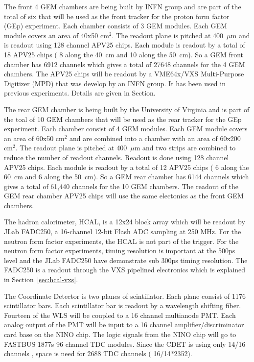 \documentclass{article}
\begin{document}
The front 4 GEM chambers are being built by INFN group and are part of the total of six that
will be used as the front tracker for the proton form factor (GEp) experiment. Each chamber consists
of 3 GEM modules. Each GEM module covers an area of 40x50 cm$^2$. The readout plane is pitched at 400~$\mu$m
and is readout using 128 channel APV25 chips. Each module is readout by a total of 18 APV25 chips ( 8 along
the 40~cm and 10 along the 50~cm). So a GEM front chamber has 6912 channels which gives a total of 27648 channels
for the 4 GEM chambers. The APV25 chips will be readout by a VME64x/VXS Multi-Purpose Digitizer (MPD) that was
develop by an INFN group. It has been used in previous experiments. Details are given in Section.

The rear GEM chamber is being built by the University of Virginia and is part of the toal of 10 GEM chambers
that will be used as the rear tracker for the GEp experiment. Each chamber consist of 4 GEM modules.
 Each GEM module covers an area of 60x50 cm$^2$ and are combined into a chamber with an area
of 60x200 cm$^2$. The readout plane is pitched at 400~$\mu$m and two strips are combined to reduce
the number of readout channels. Readout is done using 128 channel APV25 chips. Each module is readout 
by a total of  12 APV25 chips (  6 along the 60~cm and 6 along the 50~cm). So a GEM rear chamber has  
6144 channels which gives a total of 61,440 channels for the 10 GEM chambers. The readout of the GEM
rear chamber APV25 chips will use the same electonics as the front GEM chambers.  
 
The hadron calorimeter, HCAL, is a 12x24 block array which will be readout by JLab FADC250, a 16-channel 12-bit Flash 
ADC sampling at 250 MHz. For the neutron form factor experiments, the HCAL is not part of the trigger. For the
neutron form factor experiments, timing resolution is important at the 500ps level and the JLab FADC250 have 
demonstrate sub 300ps timing resolution. The FADC250 is a readout through the VXS pipelined electronics
which is explained in Section~\ref{sec:hcal-vxs}.


The Coordinate Detector is  two planes of scintillator. Each plane consist of 1176 scintillator bars. 
Each scintillator bar is readout by a wavelength shifting fiber. Fourteen of the WLS  will be coupled to
a 16 channel multianode PMT. Each analog output of the PMT will be input to a 16 channel amplifier/discriminator
card base on the NINO chip. The logic signals from the NINO chip will go to FASTBUS 1877s 96 channel TDC modules.
Since the CDET is using only 14/16 channels , space is need for 2688 TDC channels ( 16/14*2352).
 
\end{document}
